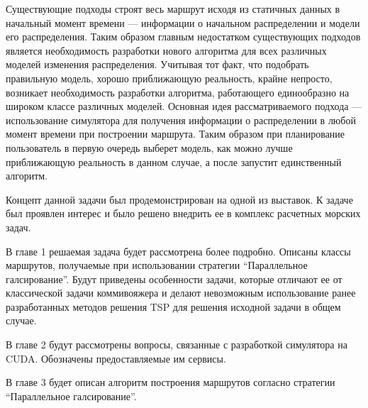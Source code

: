 \startprefacepage


 Существующие подходы строят весь маршрут исходя из статичных данных в начальный момент
времени --- информации о начальном распределении и модели его распределения.
Таким образом главным недостатком существующих подходов является необходимость
разработки нового алгоритма для всех различных моделей изменения распределения.
Учитывая тот факт, что подобрать правильную модель, хорошо приближающую реальность,
 крайне непросто, возникает необходимость разработки алгоритма,
 работающего единообразно на широком классе различных моделей.
 Основная идея рассматриваемого подхода --- использование симулятора для получения
 информации о распределении в любой момент времени при построении маршрута.
 Таким образом при планирование пользователь в первую очередь выберет модель,
 как можно лучше приближающую реальность в данном случае, а после запустит единственный алгоритм.

Концепт данной задачи был продемонстрирован на одной из выставок. К задаче был проявлен 
интерес и было решено внедрить ее в комплекс расчетных морских задач.

В главе 1 решаемая задача будет рассмотрена более подробно.
 Описаны классы маршрутов, получаемые при использовании стратегии ``Параллельное галсирование''. 
Будут приведены особенности задачи, которые отличают ее от классической задачи коммивояжера
 и делают невозможным использование ранее разработанных методов решения TSP
 для решения исходной задачи в общем случае.

В главе 2 будут рассмотрены вопросы, связанные с разработкой симулятора на CUDA. Обозначены предоставляемые им сервисы.

В главе 3 будет описан алгоритм построения маршрутов согласно стратегии ``Параллельное галсирование''.

